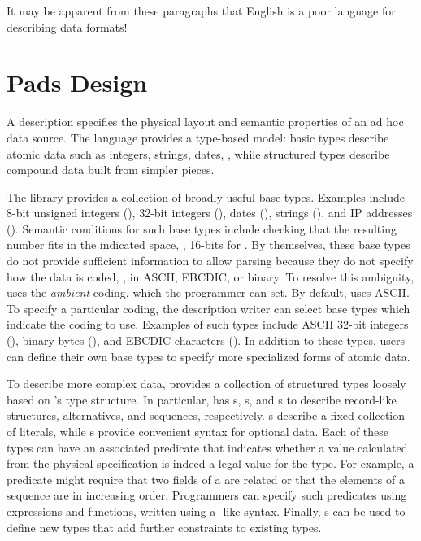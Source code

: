 \documentclass[times]{acm-sigplan}
\begin{document}
It may be apparent from these paragraphs that English is a poor
language for describing data formats!


\section{Pads Design}

A \pads{} description specifies the physical layout and 
semantic properties of an ad hoc data source. 
The language provides a type-based model:
basic types describe atomic data such as integers, strings, dates, \etc{}, while
structured types describe compound data built from simpler pieces.
\suppressfloats

The \pads{} library provides a collection of broadly useful base types.
Examples include
8-bit unsigned integers (),
32-bit integers (),
dates (), strings (), and IP addresses ().
Semantic conditions for such base types include checking that the
resulting number fits in the indicated space, \ie, 16-bits for
.
By themselves, these base types do not provide sufficient information to allow parsing
because they do not specify how the data is coded, \ie{}, in ASCII, EBCDIC, or binary.  
To resolve this ambiguity, \pads{} uses the \textit{ambient} coding, which the programmer can set.  By default,
\pads{} uses ASCII.  To specify a particular coding, the description writer can select
base types which indicate the coding to use.  Examples of such types include
ASCII 32-bit integers (), binary bytes (), and
EBCDIC characters ().  
In addition to these types,  users can define their own base types to specify more
specialized forms of atomic data.  

To describe more complex data, \pads{} provides a collection of 
structured types loosely based on \C{}'s type structure.
In particular, \pads{} has 
s, s, and s to describe
record-like structures, alternatives, and sequences, respectively.
s describe a fixed collection of literals, while s 
provide convenient syntax for optional data.
Each of these
types can have an associated predicate that indicates whether a
value calculated from the physical specification is indeed a legal
value for the type.  For example, a predicate might require that two
fields of a  are related or that the elements
of a sequence are in increasing order.  Programmers can specify such
predicates using \pads{} expressions and functions, 
written using a \C{}-like syntax.
Finally, \pads{} s can be used
to define new types that add further constraints to existing types.
\end{document}
